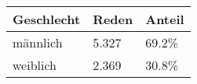 
\begin{tabular}{lll}
\toprule
Geschlecht & Reden & Anteil\\
\midrule
männlich & 5.327 & 69.2\%\\
weiblich & 2.369 & 30.8\%\\
\bottomrule
\end{tabular}